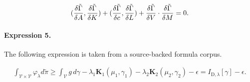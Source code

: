 \documentclass[11pt]{article}
\begin{document}
\begin{align*}({{\delta \tilde \Gamma} \over {\delta A}},{{\delta \tilde \Gamma} \over {\delta K}} )+({{\delta \tilde \Gamma} \over {\delta c}},{{\delta \tilde \Gamma} \over {\delta L}} )+{{\delta \tilde \Gamma} \over {\delta V}}\cdot{{\delta \tilde \Gamma} \over {\delta M}} =0.\end{align*}

\paragraph{Expression 5.} The following expression is taken from a source-backed formula corpus.

\begin{align*}\int_{\mathcal{V} \times \mathcal{V} } \varphi_\lambda d \widetilde{\pi} \geq \int_{\mathcal{V}} g \, d \gamma - \lambda_1 \boldsymbol{K}_{1} (\mu_1, \gamma_1) - \lambda_2 \boldsymbol{K}_{2} (\mu_2, \gamma_2) - \epsilon = I_{\mathrm{D}, \lambda}[\gamma] - \epsilon.\end{align*}
\end{document}
